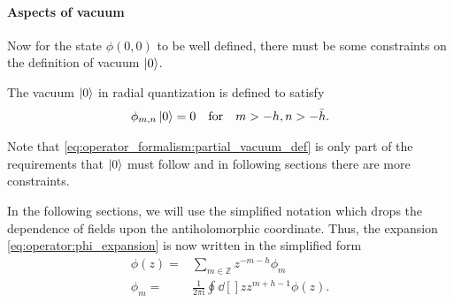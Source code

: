 \documentclass[10pt]{article}
\newcommand{\ii}{\mathrm{i}}
\begin{document}
\paragraph{Aspects of vacuum}
Now for the state $\phi(0,0)$ to be well defined, there must be some constraints on the definition of vacuum $\ket{0}$.
\begin{property}
    The vacuum $\ket{0}$ in radial quantization is defined to satisfy
    \begin{align}
        \phi_{m,n}\ket{0}=0\qfor m>-h,n>-\bar{h}.\label{eq:operator_formalism:partial_vacuum_def}
    \end{align}
\end{property}
\begin{remark}
    Note that \cref{eq:operator_formalism:partial_vacuum_def} is only part of the requirements that $\ket{0}$ must follow and in following sections there are more constraints.
\end{remark}
In the following sections, we will use the simplified notation which drops the dependence of fields upon the antiholomorphic coordinate.
Thus, the expansion \cref{eq:operator:phi_expansion} is now written in the simplified form
\begin{subequations}
    \begin{align}
        \phi(z)= & \sum_{m\in\mathbb{Z}}z^{-m-h}\phi_m             \\
        \phi_m=  & \frac{1}{2\pi\ii}\oint\dd[]{z}z^{m+h-1}\phi(z).
    \end{align}
\end{subequations}
\end{document}

